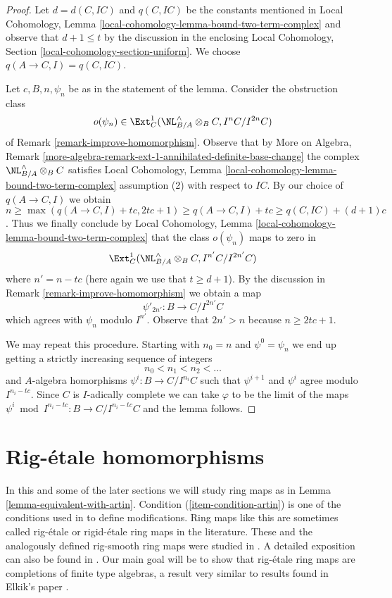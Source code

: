 \begin{proof}
Let $d = d(C, IC)$ and $q(C, IC)$ be the constants mentioned in
Local Cohomology, Lemma \ref{local-cohomology-lemma-bound-two-term-complex}
and observe that $d + 1 \leq t$ by the discussion in the enclosing
Local Cohomology, Section \ref{local-cohomology-section-uniform}.
We choose $q(A \to C, I) = q(C, IC)$.

\medskip\noindent
Let $c, B, n, \psi_n$ be as in the statement of the lemma.
Consider the obstruction class
$$
o(\psi_n) \in \Ext^1_C(\NL_{B/A}^\wedge \otimes_B C, I^nC/I^{2n}C)
$$
of Remark \ref{remark-improve-homomorphism}. Observe that by
More on Algebra, Remark
\ref{more-algebra-remark-ext-1-annihilated-definite-base-change} the complex
$\NL_{B/A}^\wedge \otimes_B C$ satisfies
Local Cohomology, Lemma \ref{local-cohomology-lemma-bound-two-term-complex}
assumption (2) with respect to $IC$.
By our choice of $q(A \to C, I)$ we obtain
$n \geq  \max(q(A \to C, I) + tc, 2tc + 1) \geq q(A \to C, I) + tc
\geq q(C, IC) + (d + 1)c$. Thus we finally conclude by
Local Cohomology, Lemma \ref{local-cohomology-lemma-bound-two-term-complex}
that the class $o(\psi_n)$ maps to zero in
$$
\Ext^1_C(\NL_{B/A}^\wedge \otimes_B C, I^{n'}C/I^{2n'}C)
$$
where $n' = n - tc$ (here again we use that $t \geq d + 1$).
By the discussion in Remark \ref{remark-improve-homomorphism} we obtain a map
$$
\psi'_{2n'} : B \to C/I^{2n'}C
$$
which agrees with $\psi_n$ modulo $I^{n'}$.
Observe that $2n' > n$ because $n \geq 2tc + 1$.

\medskip\noindent
We may repeat this procedure. Starting with $n_0 = n$ and
$\psi^0 = \psi_n$ we end up getting a strictly increasing
sequence of integers
$$
n_0 < n_1 < n_2 < \ldots
$$
and $A$-algebra homorphisms $\psi^i : B \to C/I^{n_i}C$
such that $\psi^{i + 1}$ and $\psi^i$ agree modulo $I^{n_i - tc}$.
Since $C$ is $I$-adically complete we can take $\varphi$
to be the limit of the maps
$\psi^i \bmod I^{n_i - tc} : B \to C/I^{n_i - tc}C$
and the lemma follows.
\end{proof}












\section{Rig-\'etale homomorphisms}
\label{section-rig-etale}

\noindent
In this and some of the later sections we will study ring maps as
in Lemma \ref{lemma-equivalent-with-artin}. Condition
(\ref{item-condition-artin}) is one of the conditions used in
\cite{ArtinII} to define modifications. Ring maps like this are sometimes
called rig-\'etale or rigid-\'etale ring maps in the literature. These and
the analogously defined rig-smooth ring maps were studied
in \cite{Elkik}. A detailed exposition can also be found in
\cite{Abbes}. Our main goal will be to show that rig-\'etale
ring maps are completions of finite type algebras, a result
very similar to results found in Elkik's paper \cite{Elkik}.

